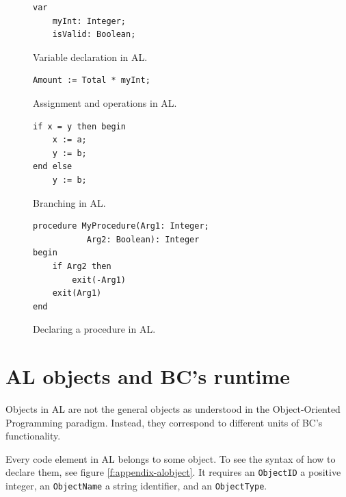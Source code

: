 \begin{figure}
    \begin{minipage}{.45\textwidth}
        \begin{Verbatim}[fontsize=\tiny]
var
    myInt: Integer;
    isValid: Boolean;
        \end{Verbatim}
        \parbox{0.9\textwidth}{\caption{Variable declaration in AL.}}
        \label{fig:al-var-decl}
    \end{minipage}%
    \begin{minipage}{.45\textwidth}
        \begin{Verbatim}[fontsize=\tiny]
Amount := Total * myInt;
        \end{Verbatim}
        \caption{Assignment and operations in AL.}
    \end{minipage}
\end{figure}

\begin{figure}
    \begin{minipage}{.45\textwidth}
        \begin{Verbatim}[fontsize=\tiny]
if x = y then begin  
    x := a;  
    y := b;  
end else 
    y := b;   
        \end{Verbatim}
        \parbox{0.9\textwidth}{\caption{Branching in AL.}}
    \end{minipage}%
    \begin{minipage}{.45\textwidth}
        \begin{Verbatim}[fontsize=\tiny]
procedure MyProcedure(Arg1: Integer; 
           Arg2: Boolean): Integer
begin
    if Arg2 then
        exit(-Arg1)
    exit(Arg1)
end
        \end{Verbatim}
        \parbox{0.9\textwidth}{\caption{Declaring a procedure in AL.}}
        \label{fig:al-proc-decl}
    \end{minipage}%

\end{figure}

\section{AL objects and BC's runtime}
Objects in AL are not the general objects as understood in the Object-Oriented Programming paradigm. Instead,
they correspond to different units of BC's functionality.

Every code element in AL belongs to some object. To see the syntax of how to declare them, see figure \ref{f:appendix-alobject}.
It requires an \texttt{ObjectID} a positive integer, an \texttt{ObjectName} a string identifier, and an \texttt{ObjectType}.

